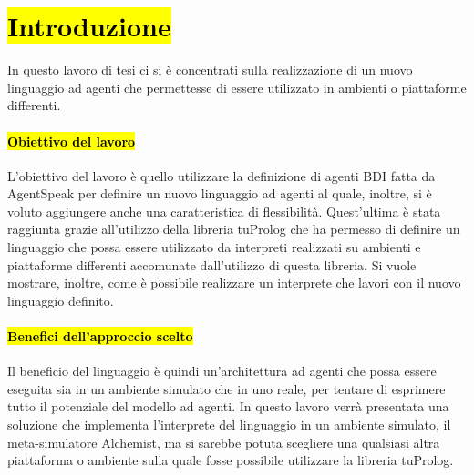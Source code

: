 \chapter{\hl{Introduzione}}
\lhead[\fancyplain{}{\bfseries\thepage}]{\fancyplain{}{\bfseries\rightmark}}
In questo lavoro di tesi ci si è concentrati sulla realizzazione di un nuovo linguaggio ad agenti che permettesse di essere utilizzato in ambienti o piattaforme differenti.

\subsubsection{\hl{Obiettivo del lavoro}}
L'obiettivo del lavoro è quello utilizzare la definizione di agenti BDI fatta da AgentSpeak per definire un nuovo linguaggio ad agenti al quale, inoltre, si è voluto aggiungere anche una caratteristica di flessibilità. Quest'ultima è stata raggiunta grazie all'utilizzo della libreria tuProlog che ha permesso di definire un linguaggio che possa essere utilizzato da interpreti realizzati su ambienti e piattaforme differenti accomunate dall'utilizzo di questa libreria.
Si vuole mostrare, inoltre, come è possibile realizzare un interprete che lavori con il nuovo linguaggio definito.

\subsubsection{\hl{Benefici dell'approccio scelto}}
Il beneficio del linguaggio è quindi un'architettura ad agenti che possa essere eseguita sia in un ambiente simulato che in uno reale, per tentare di esprimere tutto il potenziale del modello ad agenti. In questo lavoro verrà presentata una soluzione che implementa l'interprete del linguaggio in un ambiente simulato, il meta-simulatore Alchemist, ma si sarebbe potuta scegliere una qualsiasi altra piattaforma o ambiente sulla quale fosse possibile utilizzare la libreria tuProlog.